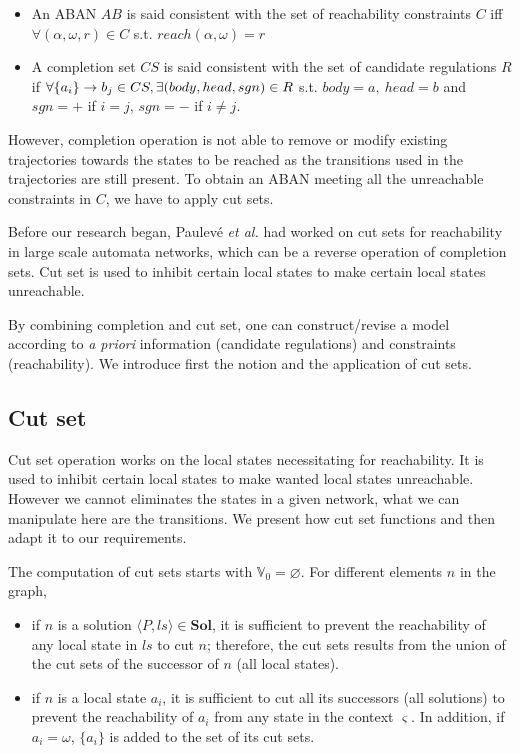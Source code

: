 \begin{definition}[Consistency]\label{def:consistencyFirst}
\leavevmode
\makeatletter
\@nobreaktrue
\makeatother
\begin{itemize}
    \item An ABAN $AB$ is said consistent with the set of reachability constraints $C$ iff $\forall (\alpha,\omega,r)\in C$ s.t. $reach(\alpha,\omega)=r$
    \item A completion set $CS$ is said consistent with the set of candidate regulations $R$ if $\forall \acm{a_i}{b_{1-j}}{b_j}\in CS, \exists (body,head,sgn)\in R$ s.t. $body=a,\ head=b$ and $sgn=+$ if $i=j$, $sgn=-$ if $i\neq j$. 
\end{itemize}
    
\end{definition}

However, completion operation is not able to remove or modify existing trajectories towards the states to be reached as the transitions used in the trajectories are still present.
To obtain an ABAN meeting all the unreachable constraints in $C$, we have to apply cut sets.

Before our research began, Paulev\'e \textit{et al.} \cite{PAK13-CAV} had worked on cut sets for reachability in large scale automata networks, which can be a reverse operation of completion sets.
Cut set is used to inhibit certain local states to make certain local states unreachable.

By combining completion and cut set, one can construct/revise a model according to \textit{a priori} information (candidate regulations) and constraints (reachability).
We introduce first the notion and the application of cut sets.

\subsection{Cut set}\label{sec:cutsetModelInfer}

Cut set operation works on the local states necessitating for reachability. 
It is used to inhibit certain local states to make wanted local states unreachable.
However we cannot eliminates the states in a given network, what we can manipulate here are the transitions. 
We present how cut set functions and then adapt it to our requirements.

The computation of cut sets starts with $\mathbb{V}_0=\varnothing$.
For different elements $n$ in the graph,  

\begin{itemize}
\item if $n$ is a solution $\langle P,ls\rangle\in \mathbf{Sol}$, it is sufficient to prevent the reachability of any local state in $ls$ to cut $n$; therefore, the cut sets results from the union
of the cut sets of the successor of $n$ (all local states).
\item if $n$ is a local state $a_i$,  it is sufficient to cut all its successors (all solutions) to prevent the reachability of $a_i$ from any state in the context $\varsigma$. 
In addition, if $a_i=\omega$, $\{a_i\}$ is added to the set of its cut sets.
\end{itemize}

